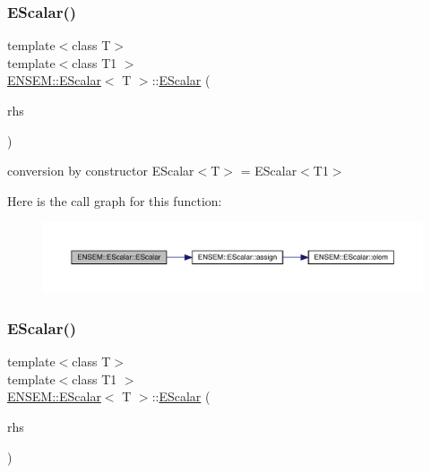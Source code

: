 \subsubsection{\texorpdfstring{EScalar()}{EScalar()}\hspace{0.1cm}{\footnotesize\ttfamily [4/12]}}
{\footnotesize\ttfamily template$<$class T$>$ \\
template$<$class T1 $>$ \\
\mbox{\hyperlink{classENSEM_1_1EScalar}{E\+N\+S\+E\+M\+::\+E\+Scalar}}$<$ T $>$\+::\mbox{\hyperlink{classENSEM_1_1EScalar}{E\+Scalar}} (\begin{DoxyParamCaption}\item[{const \mbox{\hyperlink{classENSEM_1_1EScalar}{E\+Scalar}}$<$ T1 $>$ \&}]{rhs }\end{DoxyParamCaption})\hspace{0.3cm}{\ttfamily [inline]}}



conversion by constructor E\+Scalar$<$\+T$>$ = E\+Scalar$<$\+T1$>$ 

Here is the call graph for this function\+:
\nopagebreak
\begin{figure}[H]
\begin{center}
\leavevmode
\includegraphics[width=350pt]{d0/d82/classENSEM_1_1EScalar_a62e800e98a28c98a6d297eb613e86f82_cgraph}
\end{center}
\end{figure}
\mbox{\label{classENSEM_1_1EScalar_a1436a0e5b8bf00083caf1540f4fc9397}} 
\subsubsection{\texorpdfstring{EScalar()}{EScalar()}\hspace{0.1cm}{\footnotesize\ttfamily [5/12]}}
{\footnotesize\ttfamily template$<$class T$>$ \\
template$<$class T1 $>$ \\
\mbox{\hyperlink{classENSEM_1_1EScalar}{E\+N\+S\+E\+M\+::\+E\+Scalar}}$<$ T $>$\+::\mbox{\hyperlink{classENSEM_1_1EScalar}{E\+Scalar}} (\begin{DoxyParamCaption}\item[{const T1 \&}]{rhs }\end{DoxyParamCaption})\hspace{0.3cm}{\ttfamily [inline]}}



